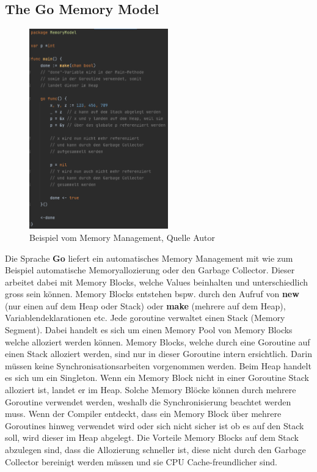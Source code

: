 \documentclass[12pt,titlepage]{article}
\begin{document}
\subsection{The Go Memory Model}
\begin{figure}
	\centering
	\includegraphics[width=6cm]{memorymodel}
	\caption{Beispiel vom Memory Management, Quelle Autor}\label{memorymodel}
\end{figure}
Die Sprache \textbf{Go} liefert ein automatisches Memory Management mit wie zum Beispiel automatische Memoryallozierung oder den Garbage Collector.
Dieser arbeitet dabei mit Memory Blocks, welche Values beinhalten und unterschiedlich gross sein können.
Memory Blocks entstehen bspw. durch den Aufruf von \textbf{new} (nur einen auf dem Heap oder Stack) oder \textbf{make} (mehrere auf dem Heap), Variablendeklarationen etc.
Jede goroutine verwaltet einen Stack (Memory Segment).
Dabei handelt es sich um einen Memory Pool von Memory Blocks welche alloziert werden können.
Memory Blocks, welche durch eine Goroutine auf einen Stack alloziert werden, sind nur in dieser Goroutine intern ersichtlich.
Darin müssen keine Synchronisationsarbeiten vorgenommen werden.
Beim Heap handelt es sich um ein Singleton.
Wenn ein Memory Block nicht in einer Goroutine Stack alloziert ist, landet er im Heap.
Solche Memory Blöcke können durch mehrere Goroutine verwendet werden, weshalb die Synchronisierung beachtet werden muss.
Wenn der Compiler entdeckt, dass ein Memory Block über mehrere Goroutines hinweg verwendet wird oder sich nicht sicher ist ob es auf den Stack soll, wird dieser im Heap abgelegt.
Die Vorteile Memory Blocks auf dem Stack abzulegen sind, dass die Allozierung schneller ist, diese nicht durch den Garbage Collector bereinigt werden müssen und sie CPU Cache-freundlicher sind.
\end{document}
